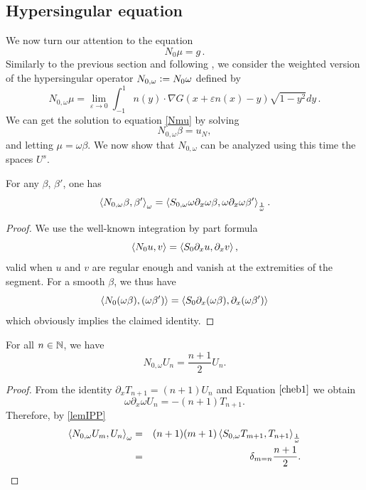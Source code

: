 \documentclass[a4paper]{article}
\begin{document}
\subsection{Hypersingular equation} 

We now turn our attention to the equation 
\begin{equation}
N_0\mu = g\,.
\label{Nmu}
\end{equation} 
\noindent Similarly to the previous section and following \cite{bruno2012second}, we consider the weighted version of the hypersingular operator $N_{0,\omega} \mathrel{\mathop:}= N_0 \omega$ defined by
\[N_{0,\omega} \mu = \lim_{\varepsilon\to 0}\int_{-1}^{1} n(y)\cdot\nabla G(x + \varepsilon n(x) - y) \sqrt{1-y^2} dy\,.\]
We can get the solution to equation \eqref{Nmu} by solving 
\begin{equation}
	N_{0,\omega} \beta = u_N,
	\label{Nomegabeta}
\end{equation}
and letting $\mu = \omega \beta$. 
We now show that $N_{0,\omega}$ can be analyzed using this time the spaces $U^s$. 
\begin{Lem}
	\label{lemIPP}
	For any $\beta$, $\beta'$, one has 
	\[\left\langle N_{0,\omega} \beta, \beta'\right\rangle_\omega = \left\langle S_{0,\omega} \omega \partial_x \omega \beta,\omega \partial_x \omega \beta'\right\rangle_\frac{1}{\omega}.\]
	\begin{proof}
		 We use the well-known integration by part formula
		\[\left\langle N_0 u,v\right\rangle = \left\langle S_0\partial_x u,\partial_x v\right\rangle,\]
		valid when $u$ and $v$ are regular enough and vanish at the extremities of the segment. 
		For a smooth $\beta$, we thus have
		\[ \left\langle N_0 (\omega \beta), (\omega \beta')\right\rangle = \left\langle S_0 \partial_x(\omega \beta),\partial_x (\omega \beta')\right\rangle\] 
		which obviously implies the claimed identity. 
	\end{proof}
\end{Lem}
\begin{Lem}
	For all $n \in \mathbb{N}$, we have 
	\[N_{0,\omega} U_n = \frac{n+1}{2}U_n.\]	
	\label{NUn}
\end{Lem}
\begin{proof}
	From the identity $\partial_x T_{n+1} = (n+1)U_n$ and Equation $\eqref{cheb1}$ we obtain
	\begin{equation*}
	\omega \partial_x \omega U_n = -(n+1) T_{n+1}.
	\end{equation*}
	Therefore, by \autoref{lemIPP}
	\begin{eqnarray}
		\left\langle N_{0,\omega} U_m,U_n\right\rangle_\omega & = & (n+1)(m+1)\left\langle S_{0,\omega} T_{m+1},T_{n+1}\right\rangle_\frac{1}{\omega}\nonumber\\
		&=& \delta_{m=n} \frac{n+1}{2}.
		\label{NomUmUn}	
	\end{eqnarray}
\end{proof}
\end{document}
